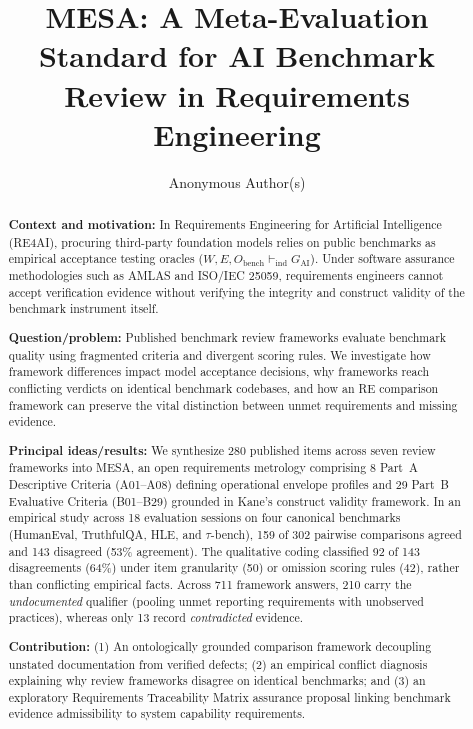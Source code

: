 \documentclass[runningheads]{llncs}
\begin{document}
\title{MESA: A Meta-Evaluation Standard for AI Benchmark Review in Requirements Engineering}

\author{Anonymous Author(s)}


\maketitle

\begin{abstract}
\textbf{Context and motivation:} In Requirements Engineering for Artificial Intelligence (RE4AI), procuring third-party foundation models relies on public benchmarks as empirical acceptance testing oracles ($W, E, O_{\text{bench}} \vdash_{\text{ind}} G_{\text{AI}}$). Under software assurance methodologies such as AMLAS and ISO/IEC 25059, requirements engineers cannot accept verification evidence without verifying the integrity and construct validity of the benchmark instrument itself.

\textbf{Question/problem:} Published benchmark review frameworks evaluate benchmark quality using fragmented criteria and divergent scoring rules. We investigate how framework differences impact model acceptance decisions, why frameworks reach conflicting verdicts on identical benchmark codebases, and how an RE comparison framework can preserve the vital distinction between unmet requirements and missing evidence.

\textbf{Principal ideas/results:} We synthesize 280 published items across seven review frameworks into MESA, an open requirements metrology comprising 8 Part~A Descriptive Criteria (A01--A08) defining operational envelope profiles and 29 Part~B Evaluative Criteria (B01--B29) grounded in Kane's construct validity framework. In an empirical study across 18 evaluation sessions on four canonical benchmarks (HumanEval, TruthfulQA, HLE, and $\tau$-bench), 159 of 302 pairwise comparisons agreed and 143 disagreed (53\% agreement). The qualitative coding classified 92 of 143 disagreements (64\%) under item granularity (50) or omission scoring rules (42), rather than conflicting empirical facts. Across 711 framework answers, 210 carry the \emph{undocumented} qualifier (pooling unmet reporting requirements with unobserved practices), whereas only 13 record \emph{contradicted} evidence.

\textbf{Contribution:} (1) An ontologically grounded comparison framework decoupling unstated documentation from verified defects; (2) an empirical conflict diagnosis explaining why review frameworks disagree on identical benchmarks; and (3) an exploratory Requirements Traceability Matrix assurance proposal linking benchmark evidence admissibility to system capability requirements.

\end{abstract}
\end{document}
